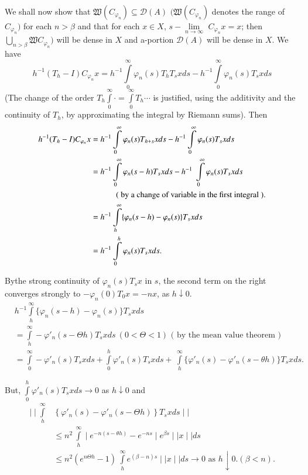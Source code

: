 We shall now show that $\mathfrak{W} ( C_{\varphi_{n}} ) \subseteq
\mathscr{D} (A) $ $ (\mathfrak{W} ( C_{\varphi_{n}} ) $ denotes the
range of $ C_{\varphi_{n}} ) $ for each $ n > \beta $ and that for
each $ x \in X $, $ s - \lim \limits_{n \rightarrow \infty} $  $
C_{\varphi_{n}} x = x $; then $ \bigcup \limits_{n >
 \beta}\mathfrak{W} C_{\varphi_{n}} ) $ will be dense in $X$ and
a-portion $\mathscr{D} (A)$ will be dense in $X$. We have 
$$
h^{-1} (T_h -I ) C_{\varphi_{n}} x = h^{-1} \int
\limits^{\infty}_{0} \varphi_n (s) T_h T_s x ds- h^{-1} \int
\limits^{\infty}_{0} \varphi_{n} (s) T_s x ds 
$$ 
(The change of the order $T_h \int \limits^{\infty}_{0} \cdot = \int
\limits^{\infty}_{0} T_h \cdots $ is justified, using the additivity
and the continuity of $ T_h $, by approximating the integral by
Riemann sums). Then 
\begin{align*}
 h^{-1} ( T_h - I) C_{\varphi_{n}} x &= h^{-1} \int
 \limits^{\infty}_{0} \varphi_n (s) T_{h+s} x ds -h^{-1} \int
 \limits^{\infty}_{0} \varphi_n (s) T_s x ds \\ 
 &= h^{-1} \int \limits^{\infty}_{0} \varphi_n (s-h) T_s x ds -
 h^{-1} ~ \int \limits^{\infty}_{0} \varphi_n (s) T_s x ds\\ 
 &\hspace{1.cm} \text{ ( by a change of variable in the first
  integral ).} \\ 
 &= h^{-1} \int\limits^{\infty}_{h} \{ \varphi_n (s -h) - \varphi_n
 (s) \} T_s x ds\\ 
 &= h^{-1} \int \limits^{h}_{0} \varphi_n (s) T_s x ds.
\end{align*}

By\pageoriginale the strong continuity of $ \varphi_n (s) T_s x $ in $s$, the
second term on the right converges strongly to $ - \varphi_n (0) T_0 x
= -nx $, as $ h \downarrow 0 $. 
\begin{align*}
 & h^{-1} \int \limits^{\infty}_{h} \{ \varphi_n (s-h) - \varphi_n
 (s) \} T_s x ds \\ 
 &= \int \limits^{\infty}_{h} - \varphi'_n ( s - \Theta h ) T_s x ds
 ~ ( 0 < \Theta < 1 ) \text{ ( by the mean value theorem )} \\ 
 &= \int \limits^{\infty}_{0} - \varphi'_n (s) T_s x ds +
 \int\limits^{h}_{0} \varphi'_n (s) T_s x ds + ~ \int
 \limits^{\infty}_{h} \{ \varphi'_n (s) - \varphi'_n ( s - \theta h )
 \} T_s x ds. 
\end{align*}

But, $ \int \limits^{h}_{0} \varphi'_n (s) T_s x ds \rightarrow 0 $
as $ h \downarrow 0 $ and 
\begin{align*}
 \mid\mid \int \limits^{\infty}_{h} & \left\{ \varphi'_n (s) - \varphi'_n
 ( s - \Theta h )\right\} T_s x ds \mid\mid \\ 
 &\leq n^2 ~ \int \limits^{\infty}_{h} \mid e^{-n ( s - \theta h )}
 -e^{-ns} \mid e^{\beta s} \mid\mid x \mid\mid ds \\ 
 &\leq n^2 ( e^{n \Theta h} -1 ) ~ \int \limits^{\infty}_{h} e^{(
  \beta-n) s} \mid\mid x \mid\mid ds \rightarrow 0 \text{ as } h
 \downarrow 0. ( \beta < n ). 
\end{align*}

